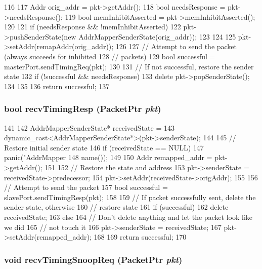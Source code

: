 \begin{DoxyCode}
116 {
117     Addr orig_addr = pkt->getAddr();
118     bool needsResponse = pkt->needsResponse();
119     bool memInhibitAsserted = pkt->memInhibitAsserted();
120 
121     if (needsResponse && !memInhibitAsserted) {
122         pkt->pushSenderState(new AddrMapperSenderState(orig_addr));
123     }
124 
125     pkt->setAddr(remapAddr(orig_addr));
126 
127     // Attempt to send the packet (always succeeds for inhibited
128     // packets)
129     bool successful = masterPort.sendTimingReq(pkt);
130 
131     // If not successful, restore the sender state
132     if (!successful && needsResponse) {
133         delete pkt->popSenderState();
134     }
135 
136     return successful;
137 }
\end{DoxyCode}
\hypertarget{classAddrMapper_a482dba5588f4bee43e498875a61e5e0b}{
\subsubsection[{recvTimingResp}]{\setlength{\rightskip}{0pt plus 5cm}bool recvTimingResp ({\bf PacketPtr} {\em pkt})}}
\label{classAddrMapper_a482dba5588f4bee43e498875a61e5e0b}



\begin{DoxyCode}
141 {
142     AddrMapperSenderState* receivedState =
143         dynamic_cast<AddrMapperSenderState*>(pkt->senderState);
144 
145     // Restore initial sender state
146     if (receivedState == NULL)
147         panic("AddrMapper %
148               name());
149 
150     Addr remapped_addr = pkt->getAddr();
151 
152     // Restore the state and address
153     pkt->senderState = receivedState->predecessor;
154     pkt->setAddr(receivedState->origAddr);
155 
156     // Attempt to send the packet
157     bool successful = slavePort.sendTimingResp(pkt);
158 
159     // If packet successfully sent, delete the sender state, otherwise
160     // restore state
161     if (successful) {
162         delete receivedState;
163     } else {
164         // Don't delete anything and let the packet look like we did
165         // not touch it
166         pkt->senderState = receivedState;
167         pkt->setAddr(remapped_addr);
168     }
169     return successful;
170 }
\end{DoxyCode}
\hypertarget{classAddrMapper_aff3031c56fc4947a19695c868bb8233e}{
\subsubsection[{recvTimingSnoopReq}]{\setlength{\rightskip}{0pt plus 5cm}void recvTimingSnoopReq ({\bf PacketPtr} {\em pkt})}}
\label{classAddrMapper_aff3031c56fc4947a19695c868bb8233e}



